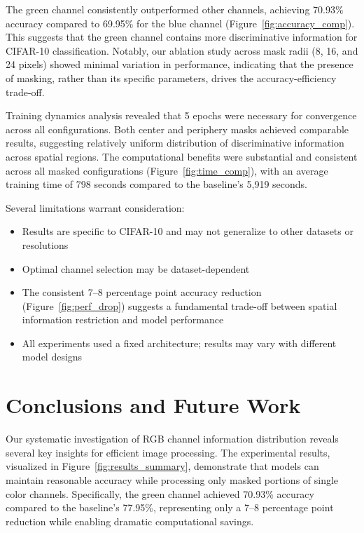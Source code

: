 \documentclass{article} %
\begin{document}
The green channel consistently outperformed other channels, achieving 70.93\% accuracy compared to 69.95\% for the blue channel (Figure~\ref{fig:accuracy_comp}). This suggests that the green channel contains more discriminative information for CIFAR-10 classification. Notably, our ablation study across mask radii (8, 16, and 24 pixels) showed minimal variation in performance, indicating that the presence of masking, rather than its specific parameters, drives the accuracy-efficiency trade-off.

Training dynamics analysis revealed that 5 epochs were necessary for convergence across all configurations. Both center and periphery masks achieved comparable results, suggesting relatively uniform distribution of discriminative information across spatial regions. The computational benefits were substantial and consistent across all masked configurations (Figure~\ref{fig:time_comp}), with an average training time of 798 seconds compared to the baseline's 5,919 seconds.

Several limitations warrant consideration:
\begin{itemize}
    \item Results are specific to CIFAR-10 and may not generalize to other datasets or resolutions
    \item Optimal channel selection may be dataset-dependent
    \item The consistent 7--8 percentage point accuracy reduction (Figure~\ref{fig:perf_drop}) suggests a fundamental trade-off between spatial information restriction and model performance
    \item All experiments used a fixed architecture; results may vary with different model designs
\end{itemize}

\section{Conclusions and Future Work}
\label{sec:conclusion}

Our systematic investigation of RGB channel information distribution reveals several key insights for efficient image processing. The experimental results, visualized in Figure~\ref{fig:results_summary}, demonstrate that models can maintain reasonable accuracy while processing only masked portions of single color channels. Specifically, the green channel achieved 70.93\% accuracy compared to the baseline's 77.95\%, representing only a 7--8 percentage point reduction while enabling dramatic computational savings.
\end{document}
